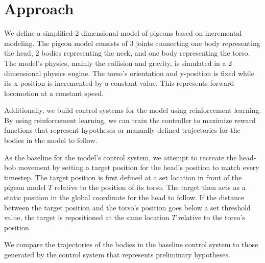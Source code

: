 \chapter{Approach}
  We define a simplified 2-dimensional model of pigeons based on incremental modeling. The pigeon model consists of 3 joints connecting one body representing the head, 2 bodies representing the neck, and one body representing the torso. The model's physics, mainly the collision and gravity, is simulated in a 2 dimensional physics engine. The torso's orientation and y-position is fixed while its x-position is incremented by a constant value. This represents forward locomotion at a constant speed.

  Additionally, we build control systems for the model using reinforcement learning. By using reinforcement learning, we can train the controller to maximize reward functions that represent hypotheses or manually-defined trajectories for the bodies in the model to follow.

  As the baseline for the model's control system, we attempt to recreate the head-bob movement by setting a target position for the head's position to match every timestep. The target position is first defined at a set location in front of the pigeon model $T$ relative to the position of its torso. The target then acts as a static position in the global coordinate for the head to follow. If the distance between the target position and the torso's position goes below a set threshold value, the target is repositioned at the same location $T$ relative to the torso's position.

  We compare the trajectories of the bodies in the baseline control system to those generated by the control system that represents preliminary hypotheses.




